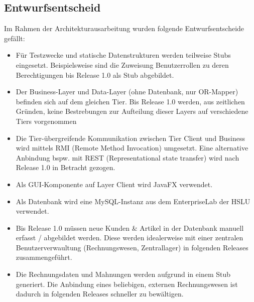 \subsection{Entwurfsentscheid}
Im Rahmen der Architekturausarbeitung wurden folgende Entwurfsentscheide gefällt:
\begin{itemize}
	\item Für Testzwecke und statische Datenstrukturen werden teilweise Stubs eingesetzt. Beispielsweise sind die Zuweisung Benutzerrollen zu deren Berechtigungen bis Release 1.0 als Stub abgebildet.
	\item Der Business-Layer und Data-Layer (ohne Datenbank, nur OR-Mapper) befinden sich auf dem gleichen Tier. Bis Release 1.0 werden, aus zeitlichen Gründen, keine Bestrebungen zur Aufteilung dieser Layers auf verschiedene Tiers vorgenommen
	\item Die Tier-übergreifende Kommunikation zwischen Tier Client und Business wird mittels RMI (Remote Method Invocation) umgesetzt. Eine alternative Anbindung bspw. mit REST (Representational state transfer) wird nach Release 1.0 in Betracht gezogen.
	\item Als GUI-Komponente auf Layer Client wird JavaFX verwendet.
	\item Als Datenbank wird eine MySQL-Instanz aus dem EnterpriseLab der HSLU verwendet.
	\item Bis Release 1.0 müssen neue Kunden \& Artikel in der Datenbank manuell erfasst / abgebildet werden. Diese werden idealerweise mit einer zentralen Benutzerverwaultung (Rechnungswesen, Zentrallager) in folgenden Releases zusammengeführt.
	\item Die Rechnungsdaten und Mahnungen werden aufgrund in einem Stub generiert. Die Anbindung eines beliebigen, externen Rechnungswesen ist dadurch in folgenden Releases schneller zu bewältigen.
\end{itemize}

